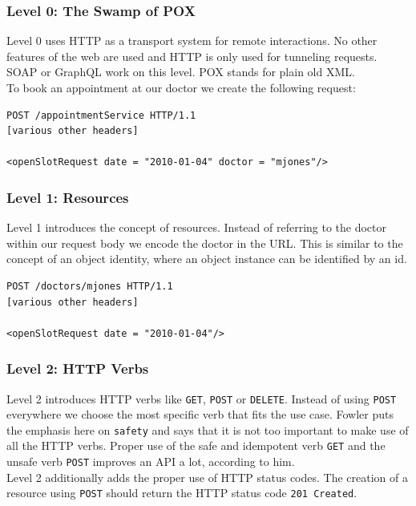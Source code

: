 \subsubsection{Level 0: The Swamp of POX}
Level 0 uses HTTP as a transport system for remote interactions. No other features of the web are used and HTTP is only used for tunneling requests. SOAP or GraphQL work on this level. POX stands for plain old XML. \\
To book an appointment at our doctor we create the following request:

\lstset{language=XML}
\begin{lstlisting}[caption=Level 0: \gls{Remote procedure call} on HTTP]
POST /appointmentService HTTP/1.1
[various other headers]

<openSlotRequest date = "2010-01-04" doctor = "mjones"/>
\end{lstlisting}

\subsubsection{Level 1: Resources}
Level 1 introduces the concept of resources. Instead of referring to the doctor within our request body we encode the doctor in the URL. This is similar to the concept of an object identity, where an object instance can be identified by an id.

\lstset{language=XML}
\begin{lstlisting}[caption=Level 1: Referring to the doctor as a resource.]
POST /doctors/mjones HTTP/1.1
[various other headers]

<openSlotRequest date = "2010-01-04"/>
\end{lstlisting}

\subsubsection{Level 2: HTTP Verbs}
Level 2 introduces HTTP verbs like \lstinline{GET}, \lstinline{POST} or \lstinline{DELETE}. Instead of using \lstinline{POST} everywhere we choose the most specific verb that fits the use case.
Fowler puts the emphasis here on \lstinline{safety} and says that it is not too important to make use of all the HTTP verbs. Proper use of the safe and idempotent verb \lstinline{GET} and the unsafe verb \lstinline{POST} improves an API a lot, according to him. \\
Level 2 additionally adds the proper use of HTTP status codes. The creation of a resource using \lstinline{POST} should return the HTTP status code \lstinline{201 Created}.

